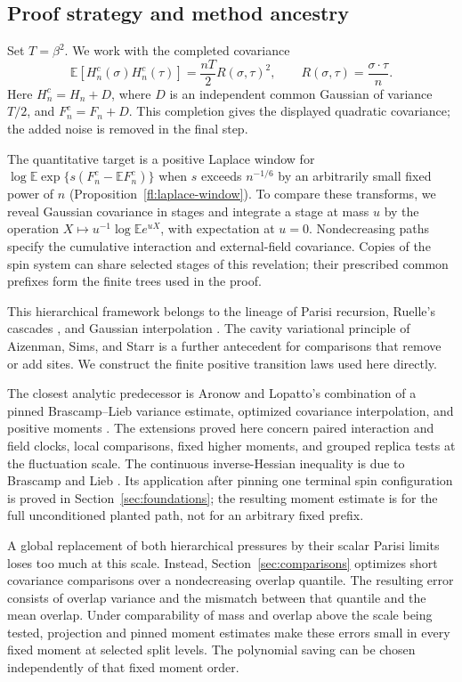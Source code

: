 \subsection{Proof strategy and method ancestry}
Set $T=\beta^2$. We work with the completed covariance
\[
 \mathbb E[H_n^c(\sigma)H_n^c(\tau)]=\frac{nT}{2}R(\sigma,\tau)^2,
 \qquad R(\sigma,\tau)=\frac{\sigma\cdot\tau}{n}.
\]
Here $H_n^c=H_n+D$, where $D$ is an independent common Gaussian of
variance $T/2$, and $F_n^c=F_n+D$. This completion gives the displayed
quadratic covariance; the added noise is removed in the final step.

The quantitative target is a positive Laplace window for
$\log\mathbb E\exp\{s(F_n^c-\mathbb EF_n^c)\}$ when $s$ exceeds
$n^{-1/6}$ by an arbitrarily small fixed power of $n$
(Proposition~\ref{fl:laplace-window}). To compare these transforms,
we reveal Gaussian covariance in stages and integrate a stage at mass
$u$ by the operation $X\mapsto u^{-1}\log\mathbb E e^{uX}$, with
expectation at $u=0$. Nondecreasing paths specify the cumulative
interaction and external-field covariance. Copies of the spin system
can share selected stages of this revelation; their prescribed common
prefixes form the finite trees used in the proof.

This hierarchical framework belongs to the lineage of Parisi recursion,
Ruelle's cascades \cite{Ruelle1987}, and Gaussian interpolation
\cite{GuerraToninelli2002,Guerra2003}. The cavity variational principle
of Aizenman, Sims, and Starr \cite{AizenmanSimsStarr2003} is a further
antecedent for comparisons that remove or add sites. We construct the
finite positive transition laws used here directly.

The closest analytic predecessor is Aronow and Lopatto's combination of
a pinned Brascamp--Lieb variance estimate, optimized covariance
interpolation, and positive moments
\cite[Propositions~2.2--2.3 and Section~3]{AL2026}.
The extensions proved here concern paired interaction and field clocks,
local comparisons, fixed higher moments, and grouped replica tests at
the fluctuation scale. The continuous inverse-Hessian inequality is due
to Brascamp and Lieb \cite{BL1976}. Its application after pinning one
terminal spin configuration is proved in Section~\ref{sec:foundations};
the resulting moment estimate is for the full unconditioned planted
path, not for an arbitrary fixed prefix.

A global replacement of both hierarchical pressures by their scalar
Parisi limits loses too much at this scale. Instead,
Section~\ref{sec:comparisons} optimizes short covariance comparisons
over a nondecreasing overlap quantile. The resulting error consists of
overlap variance and the mismatch between that quantile and the mean
overlap. Under comparability of mass and overlap above the scale being
tested, projection and pinned moment estimates make these errors small
in every fixed moment at selected split levels. The polynomial saving
can be chosen independently of that fixed moment order.

